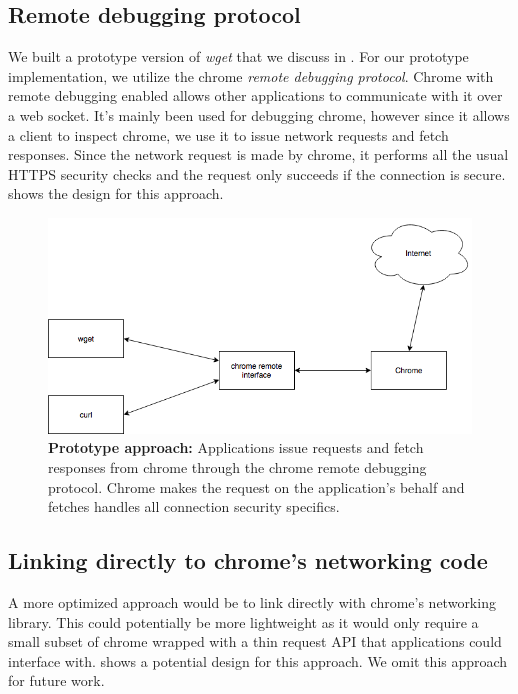\subsection{Remote debugging protocol}
We built a prototype version of \emph{wget} that we discuss in
. For our prototype implementation, we utilize the chrome
\emph{remote debugging protocol}. Chrome with remote debugging enabled allows
other applications to communicate with it over a web socket. It's mainly been
used for debugging chrome, however since it allows a client to inspect chrome,
we use it to issue network requests and fetch responses. Since the network
request is made by chrome, it performs all the usual HTTPS security checks and
the request only succeeds if the connection is secure. 
shows the design for this approach.

\begin{figure}[h]
  \includegraphics[width=\textwidth]{figures/prototype}
  \caption[Prototype approach]{\textbf{Prototype approach:} Applications issue
  requests and fetch responses from chrome through the chrome remote debugging
  protocol. Chrome makes the request on the application's behalf and fetches
  handles all connection security specifics.}
  \label{fig:prototype-saber}
\end{figure}

\subsection{Linking directly to chrome's networking code}
A more optimized approach would be to link directly with chrome's networking
library. This could potentially be more lightweight as it would only require
a small subset of chrome wrapped with a thin request API that applications
could interface with.  shows a potential design for
this approach. We omit this approach for future work.

